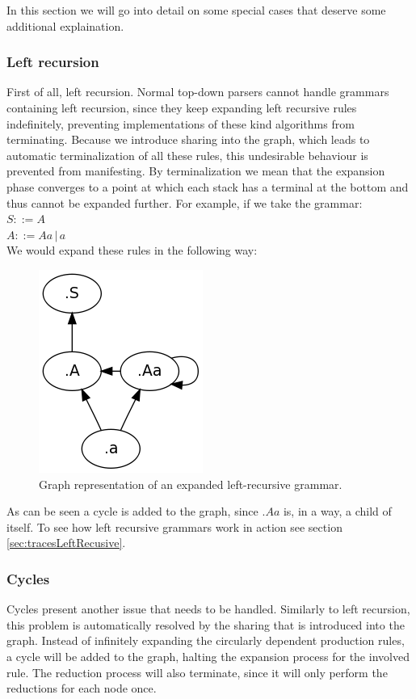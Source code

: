 \documentclass[a4paper,10pt]{article}
\begin{document}
In this section we will go into detail on some special cases that deserve some additional explaination.

\subsubsection{Left recursion}
First of all, left recursion. Normal top-down parsers cannot handle grammars containing left recursion, since they keep expanding left recursive rules indefinitely, preventing implementations of these kind algorithms from terminating. Because we introduce sharing into the graph, which leads to automatic terminalization of all these rules, this undesirable behaviour is prevented from manifesting. By terminalization we mean that the expansion phase converges to a point at which each stack has a terminal at the bottom and thus cannot be expanded further. For example, if we take the grammar:\\
$S ::= A$\\
$A ::= Aa\,|\,a$\\
We would expand these rules in the following way:
\begin{figure}[H]
\centering
\includegraphics[scale=0.5]{left-recursive.png}
\caption{Graph representation of an expanded left-recursive grammar.}
\end{figure}
As can be seen a cycle is added to the graph, since $.Aa$ is, in a way, a child of itself. To see how left recursive grammars work in action see section \ref{sec:tracesLeftRecusive}.

\subsubsection{Cycles}
Cycles present another issue that needs to be handled. Similarly to left recursion, this problem is automatically resolved by the sharing that is introduced into the graph. Instead of infinitely expanding the circularly dependent production rules, a cycle will be added to the graph, halting the expansion process for the involved rule. The reduction process will also terminate, since it will only perform the reductions for each node once.
\end{document}
